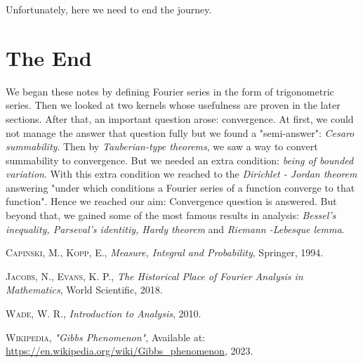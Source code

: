 \documentclass[12pt]{amsart}
\theoremstyle{definition}
\begin{document}
Unfortunately, here we need to end the journey.


\section{The End}


We began these notes by defining Fourier series in the form of trigonometric series. Then we looked at two kernels whose usefulness are proven in the later sections. After that, an important question arose: convergence. At first, we could not manage the answer that question fully but we found a "semi-answer": \emph{Cesaro summability}. Then by \emph{Tauberian-type theorems}, we saw a way to convert summability to convergence. But we needed an extra condition: \emph{being of bounded variation}. With this extra condition we reached to the \emph{Dirichlet - Jordan theorem} answering "under which conditions a Fourier series of a function converge to that function". Hence we reached our aim: Convergence question is answered. But beyond that, we gained some of the most famous results in analysis: \emph{Bessel's inequality, Parseval's identitiy, Hardy theorem} and \emph{Riemann -Lebesque lemma}.


\begin{thebibliography}{99}

 \textsc{Capinski, M., Kopp, E.}, \textit{Measure, Integral and Probability}, Springer, 1994.

 \textsc{Jacobs, N., Evans, K. P.}, \textit{The Historical Place of Fourier Analysis in Mathematics}, World Scientific, 2018.

 \textsc{Wade, W. R.}, \textit{Introduction to Analysis}, 2010.

 \textsc{Wikipedia}, \textit{"Gibbs Phenomenon"}, Available at: \url{https://en.wikipedia.org/wiki/Gibbs_phenomenon}, 2023.

\end{thebibliography}
\end{document}
